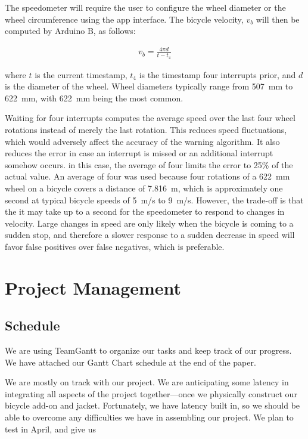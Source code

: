 \documentclass[journal]{IEEEtran}
\begin{document}
The speedometer will require the user to configure the wheel diameter or the wheel circumference using the app interface. The bicycle velocity, $v_b$ will then be computed by Arduino B, as follows:

\begin{align}
    v_b = \frac{4\pi d}{t - t_{4}}
\end{align}

where $t$ is the current timestamp, $t_{4}$ is the timestamp four interrupts prior, and $d$ is the diameter of the wheel. Wheel diameters typically range from \SI{507}{\milli\m} to \SI{622}{\milli\m}, with \SI{622}{\milli\m} being the most common. %

Waiting for four interrupts computes the average speed over the last four wheel rotations instead of merely the last rotation. This reduces speed fluctuations, which would adversely affect the accuracy of the warning algorithm. It also reduces the error in case an interrupt is missed or an additional interrupt somehow occurs. in this case, the average of four limits the error to 25\% of the actual value. An average of four was used because four rotations of a \SI{622}{\milli\meter} wheel on a bicycle covers a distance of \SI{7.816}{\m}, which is approximately one second at typical bicycle speeds of \SI{5}{\meter/\s} to \SI{9}{\meter/\s}. However, the trade-off is that the it may take up to a second for the speedometer to respond to changes in velocity. Large changes in speed are only likely when the bicycle is coming to a sudden stop, and therefore a slower response to a sudden decrease in speed will favor false positives over false negatives, which is preferable.

\section{Project Management}
\subsection{Schedule}
We are using TeamGantt to organize our tasks and keep track of our progress. We have attached our Gantt Chart schedule at the end of the paper. 

We are mostly on track with our project. We are anticipating some latency in integrating all aspects of the project together---once we physically construct our bicycle add-on and jacket. Fortunately, we have latency built in, so we should be able to overcome any difficulties we have in assembling our project. We plan to test in April, and give us 
\end{document}
